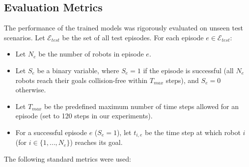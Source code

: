 \subsection{Evaluation Metrics}
\label{subsec:evaluation_metrics}
The performance of the trained models was rigorously evaluated on unseen test scenarios. Let $\mathcal{E}_{test}$ be the set of all test episodes. For each episode $e \in \mathcal{E}_{test}$:
\begin{itemize}
    \item Let $N_e$ be the number of robots in episode $e$.
    \item Let $S_e$ be a binary variable, where $S_e = 1$ if the episode is successful (all $N_e$ robots reach their goals collision-free within $T_{max}$ steps), and $S_e = 0$ otherwise.
    \item Let $T_{max}$ be the predefined maximum number of time steps allowed for an episode (set to 120 steps in our experiments).
    \item For a successful episode $e$ ($S_e=1$), let $t_{i,e}$ be the time step at which robot $i$ (for $i \in \{1, ..., N_e\}$) reaches its goal.
\end{itemize}
The following standard metrics were used:


